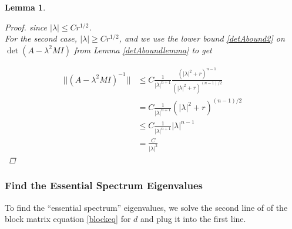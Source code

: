 \documentclass[12pt]{article}
\newtheorem{lemma}{Lemma}
\begin{document}
\begin{lemma}
\begin{proof}
since $|\lambda| \leq C r^{1/2}$.\\

For the second case, $|\lambda| \geq C r^{1/2}$, and we use the lower bound \eqref{detAbound2} on $\det(A - \lambda^2 M I)$ from Lemma \ref{detAboundlemma} to get

\begin{align*}
||(A - \lambda^2 M I)^{-1}|| &\leq C \frac{1}{|\lambda|^{n+1}} 
\frac{\left( |\lambda|^2 + r \right)^{n-1}}{\left( |\lambda|^2 + r \right)^{(n-1)/2}} \\
&= C \frac{1}{|\lambda|^{n+1}} \left( |\lambda|^2 + r \right)^{(n-1)/2} \\
&\leq C \frac{1}{|\lambda|^{n+1}} |\lambda|^{n-1} \\
&=\frac{C}{|\lambda|^2}
\end{align*}

\end{proof}
\end{lemma}

\subsubsection{Find the Essential Spectrum Eigenvalues}

To find the ``essential spectrum'' eigenvalues, we solve the second line of of the block matrix equation \eqref{blockeq} for $d$ and plug it into the first line.

\end{document}
